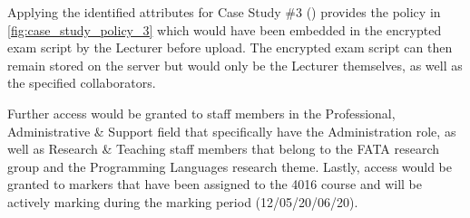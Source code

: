 Applying the identified attributes for Case Study \#3 () provides the policy in \cref{fig:case_study_policy_3} which would have been embedded in the encrypted exam script by the Lecturer before upload. The encrypted exam script can then remain stored on the server but would only be the Lecturer themselves, as well as the specified collaborators.

Further access would be granted to staff members in the Professional, Administrative \& Support field that specifically have the Administration role, as well as Research \& Teaching staff members that belong to the FATA research group and the Programming Languages research theme. Lastly, access would be granted to markers that have been assigned to the 4016 course and will be actively marking during the marking period (12/05/20/06/20).

